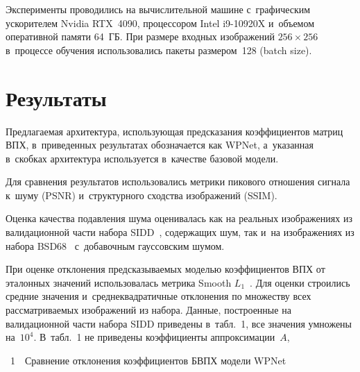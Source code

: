 \begin{multicols}{2}
Эксперименты проводились на вычислительной машине с~графическим ускорителем 
Nvidia RTX~4090, процессором Intel i9-10920X и~объемом оперативной памяти 64~ГБ. 
При размере входных изображений $256 \times 256$ в~процессе обучения 
использовались пакеты размером~128 (batch size).

\section{Результаты}

Предлагаемая архитектура, использующая предсказания коэффициентов матриц ВПХ, 
в~приведенных результатах обозначается как WPNet, 
а~указанная в~скобках архитектура используется в~качестве базовой модели.

Для сравнения результатов использовались мет\-ри\-ки пикового отношения сигнала к~шуму (PSNR) и~структурного сходства изображений (SSIM).

Оценка качества подавления шума оценивалась как на реальных изображениях из 
валидационной части набора SIDD~\cite{SIDD_2018_CVPR}, содержащих шум, так и~на 
изображениях из набора BSD68~\cite{BSD_set} с~добавочным гауссовским шумом.

При оценке отклонения предсказываемых моделью коэффициентов ВПХ от эталонных 
значений использовалась мет\-ри\-ка Smooth $L_1$~\cite{SMOOTHL1}. Для оценки 
строились сред\-ние значения и~сред\-не\-квад\-ра\-тич\-ные отклонения по множеству всех 
рас\-смат\-ри\-ва\-емых изображений из набора. Данные, по\-стро\-ен\-ные на валидационной 
части набора SIDD приведены в~табл.~1, все значения 
умножены на~$10^4$. В~табл.~1 не приведены 
коэффициенты аппроксимации~$A$,\linebreak\vspace*{-12pt}


\vspace*{-3pt}

\begin{center}
\parbox{79mm}{{{\tablename~1}\ \ \small{Сравнение отклонения коэффициентов БВПХ модели WPNet
}}

}

\vspace*{2ex}



\end{center}
\end{multicols}

